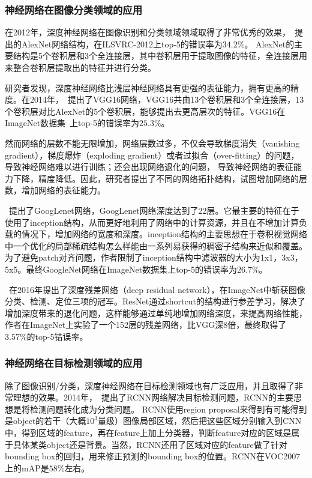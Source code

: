 \subsubsection{神经网络在图像分类领域的应用}
在2012年，深度神经网络在图像识别和分类领域领域取得了非常优秀的效果，~\citet{krizhevsky2012imagenet}提出的AlexNet网络结构，在ILSVRC-2012上top-5的错误率为$34.2\%$。 
AlexNet的主要结构是5个卷积层和3个全连接层，其中卷积层用于提取图像的特征，全连接层用来整合卷积层提取出的特征并进行分类。

研究者发现，深度神经网络比浅层神经网络具有更强的表征能力，拥有更高的精度。在2014年，~\citet{simonyan2014very}提出了VGG16网络，VGG16共由13个卷积层和3个全连接层，13个卷积层对比AlexNet的5个卷积层，能够提出去更高层次的特征。VGG16在ImageNet数据集~\cite{deng2009imagenet}上top-5的错误率为$25.3\%$。

然而网络的层数不能无限增加，网络层数过多，不仅会导致梯度消失（vanishing gradient），梯度爆炸（exploding gradient）或者过拟合（over-fitting）的问题，导致神经网络难以进行训练；还会出现网络退化的问题，
导致神经网络的表征能力下降，精度降低。因此，研究者提出了不同的网络拓扑结构，试图增加网络的层数，增加网络的表征能力。

~\citet{szegedy2015going}提出了GoogLenet网络，GoogLenet网络深度达到了22层。它最主要的特征在于使用了inception结构，从而更好地利用了网络中的计算资源，并且在不增加计算负载的情况下，增加网络的宽度和深度。inception结构的主要思想在于卷积视觉网络中一个优化的局部稀疏结构怎么样能由一系列易获得的稠密子结构来近似和覆盖。为了避免patch对齐问题，作者限制了inception结构中滤波器的大小为1x1，3x3，5x5。最终GoogleNet网络在ImageNet数据集上top-5的错误率为$26.7\%$。

~\citet{he2016deep}在2016年提出了深度残差网络（deep residual network），在ImageNet中斩获图像分类、检测、定位三项的冠军。ResNet通过shortcut的结构进行参差学习，解决了增加深度带来的退化问题，这样能够通过单纯地增加网络深度，来提高网络性能，作者在ImageNet上实验了一个152层的残差网络，比VGG深8倍，最终取得了$3.57\%$的top-5错误率。

\subsubsection{神经网络在目标检测领域的应用}
除了图像识别/分类，深度神经网络在目标检测领域也有广泛应用，并且取得了非常理想的效果。2014年，~\citet{girshick2014rich}提出了RCNN网络解决目标检测问题，RCNN的主要思想是将检测问题转化成为分类问题。
RCNN使用region proposal来得到有可能得到是object的若干（大概$10^3$量级）图像局部区域，然后把这些区域分别输入到CNN中，得到区域的feature，再在feature上加上分类器，判断feature对应的区域是属于具体某类object还是背景。当然，RCNN还用了区域对应的feature做了针对bounding box的回归，用来修正预测的bounding box的位置。RCNN在VOC2007上的mAP是$58\%$左右。

